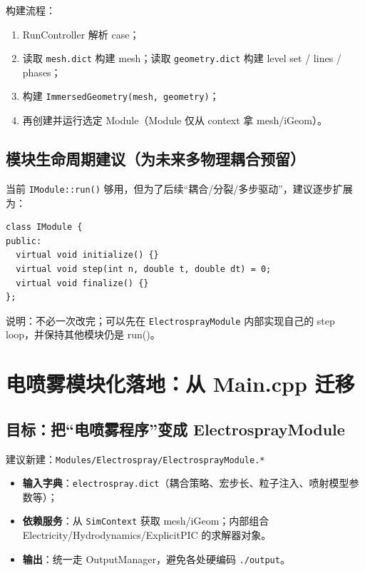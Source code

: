 \documentclass[UTF8,a4paper,11pt]{ctexart}
\begin{document}
构建流程：
\begin{enumerate}[label=\arabic*)]
  \item RunController 解析 case；
  \item 读取 \texttt{mesh.dict} 构建 mesh；读取 \texttt{geometry.dict} 构建 level set / lines / phases；
  \item 构建 \texttt{ImmersedGeometry(mesh, geometry)}；
  \item 再创建并运行选定 Module（Module 仅从 context 拿 mesh/iGeom）。
\end{enumerate}

\subsection{模块生命周期建议（为未来多物理耦合预留）}
当前 \texttt{IModule::run()} 够用，但为了后续“耦合/分裂/多步驱动”，建议逐步扩展为：
\begin{lstlisting}
class IModule {
public:
  virtual void initialize() {}
  virtual void step(int n, double t, double dt) = 0;
  virtual void finalize() {}
};
\end{lstlisting}

说明：不必一次改完；可以先在 \texttt{ElectrosprayModule} 内部实现自己的 step loop，并保持其他模块仍是 run()。

\section{电喷雾模块化落地：从 Main.cpp 迁移}

\subsection{目标：把“电喷雾程序”变成 ElectrosprayModule}
建议新建：\texttt{Modules/Electrospray/ElectrosprayModule.*}
\begin{itemize}
  \item \textbf{输入字典}：\texttt{electrospray.dict}（耦合策略、宏步长、粒子注入、喷射模型参数等）；
  \item \textbf{依赖服务}：从 \texttt{SimContext} 获取 mesh/iGeom；内部组合 Electricity/Hydrodynamics/ExplicitPIC 的求解器对象。
  \item \textbf{输出}：统一走 OutputManager，避免各处硬编码 \texttt{./output}。
\end{itemize}
\end{document}
